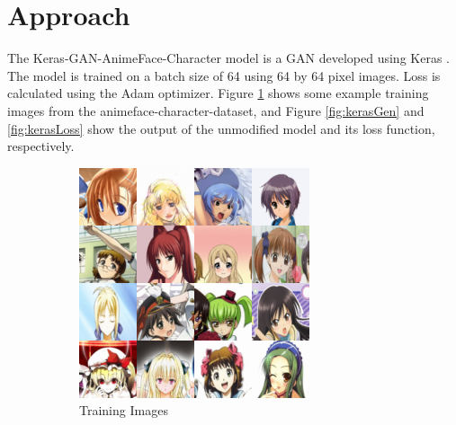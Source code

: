\documentclass{article} %
\begin{document}
\section{Approach}
The Keras-GAN-AnimeFace-Character model is a GAN developed using Keras \cite{Keras-GAN-Animeface-Character}. The model is trained on a batch size of 64 using 64 by 64 pixel images. Loss is calculated using the Adam optimizer. Figure \ref{fig:kerasReal} shows some example training images from the animeface-character-dataset, and Figure \ref{fig:kerasGen} and \ref{fig:kerasLoss} show the output of the unmodified model and its loss function, respectively.

\begin{figure}[h!]
	\centering
	\begin{subfigure}[b]{0.24\linewidth}
		\includegraphics[width=\linewidth]{keras_reals.png}
		\caption{Training Images}
		\label{fig:kerasReal}
	\end{subfigure}
	\begin{subfigure}[b]{0.24\linewidth}

\end{subfigure}
\end{figure}
\end{document}
